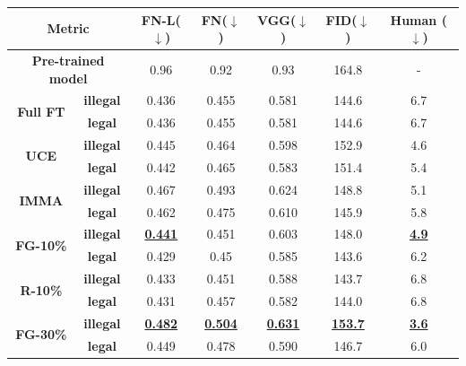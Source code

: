 \documentclass{article}
\begin{document}

\begin{table}
	\centering
	{\fontsize{9}{9}\selectfont
		\begin{tabular}{ccccccc}
			\toprule
			\multicolumn{2}{c}{\textbf{Metric}} & \textbf{FN-L($\downarrow$)} & \textbf{FN($\downarrow$)} & \textbf{VGG($\downarrow$)} & \textbf{FID($\downarrow$)} & \textbf{Human ($\downarrow$)}\\
			\midrule[1pt]
			\multicolumn{2}{c}{\textbf{Pre-trained model}} & 0.96 &0.92&0.93&164.8& -\\ 			\midrule[1pt]
			\multirow{2}{*}{\textbf{Full FT}}
			&\textbf{illegal} &0.436& 0.455& 0.581& 144.6&6.7 \\ \cmidrule(ll){2-7}
			&\textbf{legal}  &0.436& 0.455& 0.581& 144.6&6.7\\  			\midrule[1pt]
			\multirow{2}{*}{\textbf{UCE}}
			&\textbf{illegal} &0.445 & 0.464 & 0.598 &152.9&4.6  \\ \cmidrule(ll){2-7}
			&\textbf{legal} &0.442& 0.465& 0.583& 151.4&5.4 \\  			\midrule[1pt]
			\multirow{2}{*}{\textbf{IMMA}}
			&\textbf{illegal}&0.467& 0.493& 0.624& 148.8&5.1  \\ \cmidrule(ll){2-7}
			&\textbf{legal}&0.462& 0.475& 0.610& 145.9&5.8  \\  			\midrule[1pt]
			\multirow{2}{*}{\textbf{FG-10\%}}
			&\textbf{illegal}&\textbf{\underline{0.441}}&0.451&0.603& 148.0&\textbf{\underline{4.9}}  \\ \cmidrule(ll){2-7}
			&\textbf{legal}&0.429&0.45& 0.585& 143.6&6.2\\  			\midrule[1pt]
			\multirow{2}{*}{\textbf{R-10\%}}
			&\textbf{illegal}&0.433& 0.451& 0.588& 143.7&6.8  \\ \cmidrule(ll){2-7}
			&\textbf{legal}&0.431&0.457&0.582&144.0 &6.8 \\  			\midrule[1pt]
			\multirow{2}{*}{\textbf{FG-30\%}}
			&\textbf{illegal}&\textbf{\underline{0.482}}& \textbf{\underline{0.504}}&\textbf{\underline{ 0.631}}& \textbf{\underline{153.7}}&\textbf{\underline{3.6}}  \\ \cmidrule(ll){2-7}
			&\textbf{legal} &0.449& 0.478& 0.590& 146.7&6.0 \\  			\midrule[1pt]

\end{tabular}}
\end{table}
\end{document}
